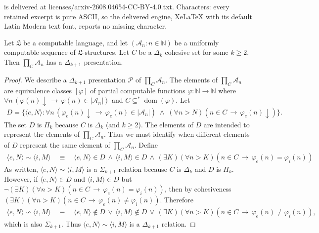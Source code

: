 \documentclass[10pt,a4paper]{amsart}
\DeclareMathOperator{\dom}{\mathrm{dom}}
\newcommand{\Nb}{\mathbb{N}}
\newcommand{\da}{{\downarrow}}
\newcommand{\imp}{\rightarrow}
\newcommand{\la}{\langle}
\newcommand{\mc}[1]{\mathcal{#1}}
\newcommand{\mf}[1]{\mathfrak{#1}}
\newcommand{\ra}{\rangle}
\begin{document}
is delivered at licenses/arxiv-2608.04654-CC-BY-4.0.txt. Characters: every retained excerpt is pure ASCII, so the delivered engine, XeLaTeX with its default Latin Modern text font, reports no missing character.
\begin{Proposition}\label{prop-Delta3Pres}
Let $\mf{L}$ be a computable language, and let $(\mc{A}_n : n \in \Nb)$ be a uniformly computable sequence of $\mf{L}$-structures.  Let $C$ be a $\Delta_k$ cohesive set for some $k \geq 2$.  Then $\prod_C \mc{A}_n$ has a $\Delta_{k+1}$ presentation.
\end{Proposition}

\begin{proof}
We describe a $\Delta_{k+1}$ presentation $\mc{P}$ of $\prod_C \mc{A}_n$.  The elements of $\prod_C \mc{A}_n$ are equivalence classes $[\varphi]$ of partial computable functions $\varphi \colon \Nb \to \Nb$ where $\forall n \, (\varphi(n)\da \,\imp\, \varphi(n) \in |\mc{A}_n|)$ and $C \subseteq^* \dom(\varphi)$.
Let
\begin{align*}
D = \{\la e, N \ra : \forall n \, (\varphi_e(n)\da \,\imp\, \varphi_e(n) \in |\mc{A}_n|) \;\land\; (\forall n > N)(n \in C \,\imp\, \varphi_e(n)\da)\}.
\end{align*}
The set $D$ is $\Pi_k$ because $C$ is $\Delta_k$ (and $k \geq 2$).  The elements of $D$ are intended to represent the elements of $\prod_C \mc{A}_n$.  Thus we must identify when different elements of $D$ represent the same element of $\prod_C \mc{A}_n$.
Define
\begin{align*}
\la e, N \ra \sim \la i, M \ra \quad\equiv\quad \la e, N \ra \in D \,\land\, \la i, M \ra \in D \,\land\, (\exists K)(\forall n > K)(n \in C \,\imp\, \varphi_e(n) = \varphi_i(n))
\end{align*}
As written, $\la e, N \ra \sim \la i, M \ra$ is a $\Sigma_{k+1}$ relation because $C$ is $\Delta_k$ and $D$ is $\Pi_k$.  However, if $\la e, N \ra \in D$ and $\la i, M \ra \in D$ but $\neg(\exists K)(\forall n > K)(n \in C \,\imp\, \varphi_e(n) = \varphi_i(n))$, then by cohesiveness $(\exists K)(\forall n > K)(n \in C \,\imp\, \varphi_e(n) \neq \varphi_i(n))$.  Therefore
\begin{align*}
\la e, N \ra \nsim \la i, M \ra \quad\equiv\quad \la e, N \ra \notin D \,\lor\, \la i, M \ra \notin D \,\lor\, (\exists K)(\forall n > K)(n \in C \,\imp\, \varphi_e(n) \neq \varphi_i(n)),
\end{align*}
which is also $\Sigma_{k+1}$.  Thus $\la e, N \ra \sim \la i, M \ra$ is a $\Delta_{k+1}$ relation.


\end{proof}
\end{document}
